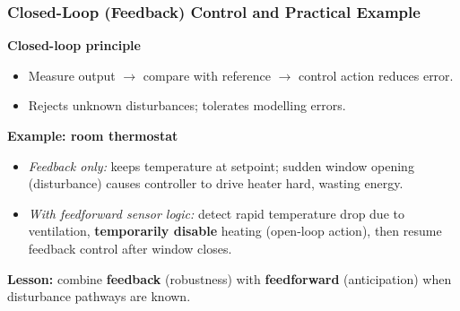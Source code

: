 \begin{frame}
	\frametitle{Closed-Loop (Feedback) Control and Practical Example}
  \textbf{Closed-loop principle}
  \begin{itemize}
    \item Measure output \(\rightarrow\) compare with reference \(\rightarrow\) control action reduces error.
    \item Rejects unknown disturbances; tolerates modelling errors.
  \end{itemize}
  \textbf{Example: room thermostat}
  \begin{itemize}
    \item \emph{Feedback only:} keeps temperature at setpoint; sudden window opening (disturbance) causes controller to drive heater hard, wasting energy.
    \item \emph{With feedforward sensor logic:} detect rapid temperature drop due to ventilation, \textbf{temporarily disable} heating (open-loop action), then resume feedback control after window closes.
  \end{itemize}
  \textbf{Lesson:} combine \textbf{feedback} (robustness) with \textbf{feedforward} (anticipation) when disturbance pathways are known.
\end{frame}


